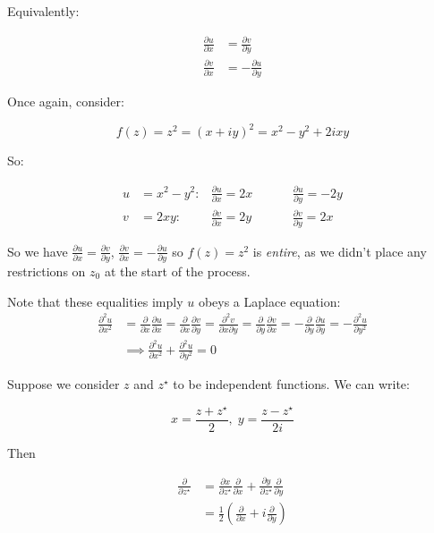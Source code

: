 \documentclass{../../physics_notes}
\begin{document}
Equivalently:

\begin{align*}
\frac{\partial u}{\partial x} &= \frac{\partial v}{\partial y} \\
\frac{\partial v}{\partial x} &= -\frac{\partial u}{\partial y}
\end{align*}

Once again, consider: 

\[ f(z) = z^2 = (x + iy)^2 = x^2 - y^2 + 2ixy \]

So:

\begin{align*}
u &= x^2 - y^2 :  & \frac{\partial u}{\partial x} = 2x \hspace{1cm} & \frac{\partial u}{\partial y} = -2y \\
v &= 2xy : & \frac{\partial v}{\partial x} = 2y \hspace{1cm} & \frac{\partial v}{\partial y} = 2x 
\end{align*}

So we have $\frac{\partial u}{\partial x} = \frac{\partial v}{\partial y}$, $\frac{\partial v}{\partial x} = -\frac{\partial u}{\partial y}$ so $f(z) = z^2$ is \emph{entire}, as we didn't place any restrictions on $z_0$ at the start of the process. 

Note that these equalities imply $u$ obeys a Laplace equation:
\begin{align*}
\frac{\partial^2 u}{\partial x^2} &= \frac{\partial}{\partial x}\frac{\partial u}{\partial x} = \frac{\partial}{\partial x} \frac{\partial v}{\partial y} = \frac{\partial^2 v}{\partial x \partial y} = \frac{\partial}{\partial y}\frac{\partial v}{\partial x} = -\frac{\partial}{\partial y}\frac{\partial u}{\partial y} = -\frac{\partial^2 u}{\partial y^2} \\
&\implies \frac{\partial^2 u}{\partial x^2} + \frac{\partial^2 u}{\partial y^2} = 0
\end{align*}

Suppose we consider $z$ and $z^\star$ to be independent functions. We can write:

\[ x = \frac{z + z^\star}{2}, \; y = \frac{z - z^\star}{2i} \]

Then 

\begin{align*} 
\frac{\partial}{\partial z^\star} &= \frac{\partial x}{\partial z^\star}\frac{\partial}{\partial x} + \frac{\partial y}{\partial z^\star}\frac{\partial}{\partial y}\\
&= \frac{1}{2}\left(\frac{\partial}{\partial x} + i\frac{\partial}{\partial y} \right)
\end{align*}
\end{document}

